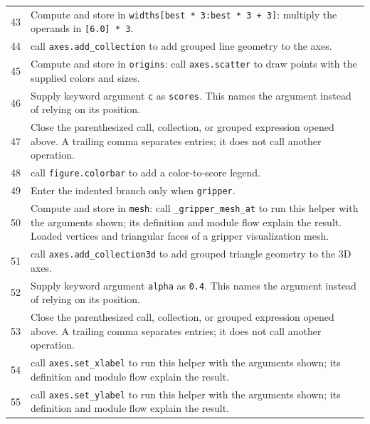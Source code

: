 \documentclass[11pt,a4paper]{book}
\begin{document}
\begin{longtable}{r p{}}
43 & Compute and store in \texttt{widths[best * 3:best * 3 + 3]}: multiply the operands in \texttt{[6.0] * 3}.  \\

44 & call \texttt{axes.add\_collection} to add grouped line geometry to the axes. \\

45 & Compute and store in \texttt{origins}: call \texttt{axes.scatter} to draw points with the supplied colors and sizes.  \\

46 & Supply keyword argument \texttt{c} as \texttt{scores}. This names the argument instead of relying on its position. \\

47 & Close the parenthesized call, collection, or grouped expression opened above. A trailing comma separates entries; it does not call another operation. \\

48 & call \texttt{figure.colorbar} to add a color-to-score legend. \\

49 & Enter the indented branch only when \texttt{gripper}. \\

50 & Compute and store in \texttt{mesh}: call \texttt{\_gripper\_mesh\_at} to run this helper with the arguments shown; its definition and module flow explain the result. Loaded vertices and triangular faces of a gripper visualization mesh. \\

51 & call \texttt{axes.add\_collection3d} to add grouped triangle geometry to the 3D axes. \\

52 & Supply keyword argument \texttt{alpha} as \texttt{0.4}. This names the argument instead of relying on its position. \\

53 & Close the parenthesized call, collection, or grouped expression opened above. A trailing comma separates entries; it does not call another operation. \\

54 & call \texttt{axes.set\_xlabel} to run this helper with the arguments shown; its definition and module flow explain the result. \\

55 & call \texttt{axes.set\_ylabel} to run this helper with the arguments shown; its definition and module flow explain the result. \\


\end{longtable}
\end{document}
